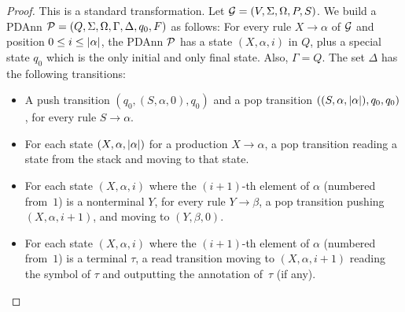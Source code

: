 \begin{proof}
	This is a standard transformation. Let $\mathcal{G} = (V, \Sigma, \Omega, P, S)$. We build a PDAnn $\mathcal{P} = (Q, \Sigma, \Omega, \Gamma, \Delta, q_0, F)$ as follows: For every rule $X \rightarrow \alpha$ of
	$\mathcal{G}$ and position $0 \leq i \leq \left|\alpha\right|$, the PDAnn $\mathcal{P}$ has a state $(X,
	\alpha, i)$ in $Q$, plus a special state $q_0$ which is the only initial and only
	final state. Also, $\Gamma = Q$. The set $\Delta$ has
	the following transitions:
	\begin{itemize}
		\item A push transition $(q_0, (S, \alpha, 0), q_0)$ and a pop transition $((S, \alpha, \left|\alpha\right|), q_0, q_0)$, for
		every rule $S \rightarrow \alpha$.
		\item For each state $(X, \alpha, \left|\alpha\right|)$ for a production $X
		\rightarrow \alpha$, a pop transition reading a state from the stack and
		moving to that state.
		\item For each state $(X, \alpha, i)$ where the $(i+1)$-th element of $\alpha$
		(numbered from~$1$) is a nonterminal $Y$, for every rule $Y \rightarrow \beta$,
		a pop transition pushing $(X, \alpha, i+1)$, and moving to $(Y, \beta, 0)$.
		\item For each state $(X, \alpha, i)$ where the $(i+1)$-th element of $\alpha$
		(numbered from~$1$) is a terminal $\tau$, a
		read transition moving to $(X, \alpha, i+1)$ reading the symbol of $\tau$
		and outputting the annotation of~$\tau$ (if any).
	\end{itemize}


\end{proof}
